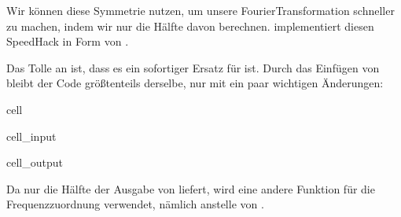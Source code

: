 \documentclass[letterpaper,10pt,english]{jupyterBook}
\begin{document}
\sphinxAtStartPar
Wir können diese Symmetrie nutzen, um unsere Fourier\sphinxhyphen{}Transformation schneller zu machen, indem wir nur die Hälfte davon berechnen.  implementiert diesen Speed\sphinxhyphen{}Hack in Form von .

\sphinxAtStartPar
Das Tolle an  ist, dass es ein sofortiger Ersatz für  ist. Durch das Einfügen von  bleibt der Code größtenteils derselbe, nur mit ein paar wichtigen Änderungen:

\begin{sphinxuseclass}{cell}\begin{sphinxVerbatimInput}

\begin{sphinxuseclass}{cell_input}
\begin{sphinxVerbatim}[commandchars=\\\{\}]
    

  
     

  
\end{sphinxVerbatim}

\end{sphinxuseclass}\end{sphinxVerbatimInput}
\begin{sphinxVerbatimOutput}

\begin{sphinxuseclass}{cell_output}
\noindent{}

\end{sphinxuseclass}\end{sphinxVerbatimOutput}

\end{sphinxuseclass}
\sphinxAtStartPar
Da  nur die Hälfte der Ausgabe von  liefert, wird eine andere Funktion für die Frequenzzuordnung verwendet, nämlich  anstelle von .
\end{document}
